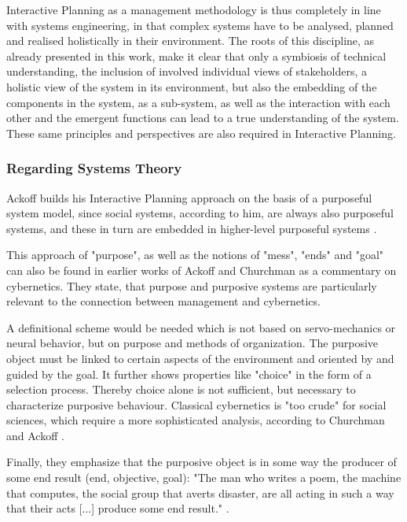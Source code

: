 \documentclass[a4paper,12pt]{article}
\begin{document}
Interactive Planning as a management methodology is thus completely in line
with systems engineering, in that complex systems have to be analysed, planned
and realised holistically in their environment. The roots of this discipline,
as already presented in this work, make it clear that only a symbiosis of
technical understanding, the inclusion of involved individual views of
stakeholders, a holistic view of the system in its environment, but also the
embedding of the components in the system, as a sub-system, as well as the
interaction with each other and the emergent functions can lead to a true
understanding of the system. These same principles and perspectives are also
required in Interactive Planning.

\subsubsection{Regarding Systems Theory}	

Ackoff builds his Interactive Planning approach on the basis of a purposeful
system model, since social systems, according to him, are always also
purposeful systems, and these in turn are embedded in higher-level purposeful
systems \cite{jackson:2003}.

This approach of "purpose", as well as the notions of "mess", "ends" and
"goal" can also be found in earlier works of Ackoff and Churchman as a
commentary on cybernetics. They state, that purpose and purposive systems are
particularly relevant to the connection between management and cybernetics.

A definitional scheme would be needed which is not based on servo-mechanics or
neural behavior, but on purpose and methods of organization. The purposive
object must be linked to certain aspects of the environment and oriented by
and guided by the goal. It further shows properties like "choice" in the form
of a selection process. Thereby choice alone is not sufficient, but necessary
to characterize purposive behaviour. Classical cybernetics is "too crude" for
social sciences, which require a more sophisticated analysis, according to
Churchman and Ackoff \cite{chruchman:1950}.

Finally, they emphasize that the purposive object is in some way the producer
of some end result (end, objective, goal): "The man who writes a poem, the
machine that computes, the social group that averts disaster, are all acting
in such a way that their acts [...] produce some end result."
\cite{chruchman:1950}.
\end{document}
